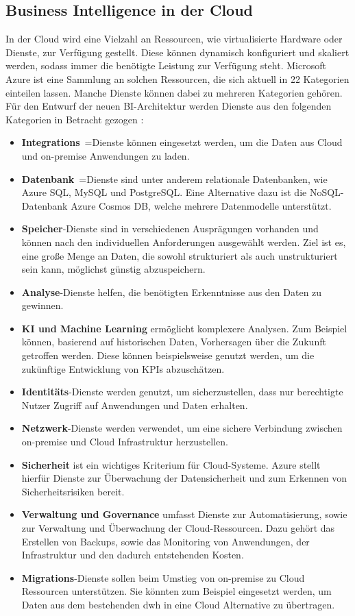 \subsection{Business Intelligence in der Cloud} \label{subsec:grundlagen:azure:bi}
In der Cloud wird eine Vielzahl an Ressourcen, wie virtualisierte Hardware oder Dienste, zur Verfügung gestellt. Diese können dynamisch konfiguriert und skaliert werden, sodass immer die benötigte Leistung zur Verfügung steht. Microsoft Azure ist eine Sammlung an solchen Ressourcen, die sich aktuell in 22 Kategorien einteilen lassen. Manche Dienste können dabei zu mehreren Kategorien gehören. Für den Entwurf der neuen BI-Architektur werden Dienste aus den folgenden Kategorien in Betracht gezogen \cite{chilberto_building_2020}:
\begin{itemize}
\item \textbf{Integrations}~=Dienste können eingesetzt werden, um die Daten aus Cloud und on-premise Anwendungen zu laden.
\item \textbf{Datenbank}~=Dienste sind unter anderem relationale Datenbanken, wie Azure SQL, MySQL und PostgreSQL. Eine Alternative dazu ist die NoSQL-Datenbank Azure Cosmos DB, welche mehrere Datenmodelle unterstützt.
\item \textbf{Speicher}-Dienste sind in verschiedenen Ausprägungen vorhanden und können nach den individuellen Anforderungen ausgewählt werden. Ziel ist es, eine große Menge an Daten, die sowohl strukturiert als auch unstrukturiert sein kann, möglichst günstig abzuspeichern.
\item \textbf{Analyse}-Dienste helfen, die benötigten Erkenntnisse aus den Daten zu gewinnen.
\item \textbf{KI und Machine Learning} ermöglicht komplexere Analysen. Zum Beispiel können, basierend auf historischen Daten, Vorhersagen über die Zukunft getroffen werden. Diese können beispielsweise genutzt werden, um die zukünftige Entwicklung von KPIs abzuschätzen.
\item \textbf{Identitäts}-Dienste werden genutzt, um sicherzustellen, dass nur berechtigte Nutzer Zugriff auf Anwendungen und Daten erhalten.
\item \textbf{Netzwerk}-Dienste werden verwendet, um eine sichere Verbindung zwischen on-premise und Cloud Infrastruktur herzustellen.
\item \textbf{Sicherheit} ist ein wichtiges Kriterium für Cloud-Systeme. Azure stellt hierfür Dienste zur Überwachung der Datensicherheit und zum Erkennen von Sicherheitsrisiken bereit.
\item \textbf{Verwaltung und Governance} umfasst Dienste zur Automatisierung, sowie zur Verwaltung und Überwachung der Cloud-Ressourcen. Dazu gehört das Erstellen von Backups, sowie das Monitoring von Anwendungen, der Infrastruktur und den dadurch entstehenden Kosten.
\item \textbf{Migrations}-Dienste sollen beim Umstieg von on-premise zu Cloud Ressourcen unterstützen. Sie könnten zum Beispiel eingesetzt werden, um Daten aus dem bestehenden \ac{dwh} in eine Cloud Alternative zu übertragen.
\end{itemize}
